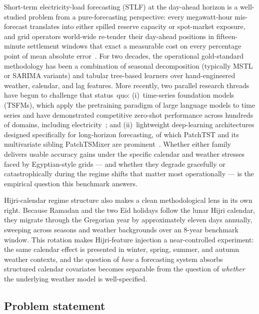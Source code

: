 \documentclass[10pt, a4paper, twocolumn]{article}
\begin{document}
Short-term electricity-load forecasting (STLF) at the day-ahead
horizon is a well-studied problem from a pure-forecasting
perspective: every megawatt-hour mis-forecast translates into
either spilled reserve capacity or spot-market exposure, and grid
operators world-wide re-tender their day-ahead positions in
fifteen-minute settlement windows that exact a measurable cost on
every percentage point of mean absolute
error~\cite{hong2016probabilistic, hong2020energy}. For two
decades, the operational gold-standard methodology has been a
combination of seasonal decomposition (typically MSTL or SARIMA
variants) and tabular tree-based learners over hand-engineered
weather, calendar, and lag features. More recently, two parallel
research threads have begun to challenge that status~quo:
(i)~time-series foundation models (TSFMs), which apply the
pretraining paradigm of large language models to time series and
have demonstrated competitive zero-shot performance across
hundreds of domains, including
electricity~\cite{ansari2024chronos, das2024timesfm, woo2024moirai, shi2024timemoe};
and (ii)~lightweight deep-learning architectures designed
specifically for long-horizon forecasting, of which PatchTST and
its multivariate sibling PatchTSMixer are
prominent~\cite{nie2023patchtst, ekambaram2023tsmixer}. Whether
either family delivers usable accuracy gains under the specific
calendar and weather stresses faced by Egyptian-style grids ---
and whether they degrade gracefully or catastrophically during
the regime shifts that matter most operationally --- is the
empirical question this benchmark answers.

Hijri-calendar regime structure also makes a clean methodological
lens in its own right. Because Ramadan and the two Eid holidays
follow the lunar Hijri calendar, they migrate through the
Gregorian year by approximately eleven days annually, sweeping
across seasons and weather backgrounds over an 8-year benchmark
window. This rotation makes Hijri-feature injection a
near-controlled experiment: the same calendar effect is presented
in winter, spring, summer, and autumn weather contexts, and the
question of \emph{how} a forecasting system absorbs structured
calendar covariates becomes separable from the question of
\emph{whether} the underlying weather model is well-specified.

\subsection{Problem statement}
\end{document}
